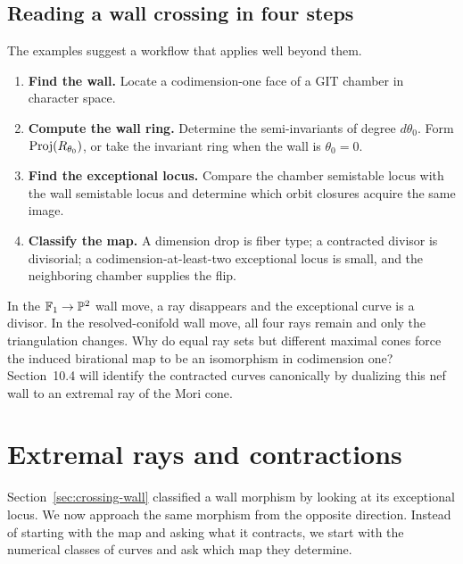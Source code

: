 \subsection{Reading a wall crossing in four steps}

The examples suggest a workflow that applies well beyond them.
\begin{enumerate}
\item \textbf{Find the wall.}
      Locate a codimension-one face of a GIT chamber in character
      space.
\item \textbf{Compute the wall ring.}
      Determine the semi-invariants of degree \(d\theta_0\).  Form
      \(\operatorname{Proj}(R_{\theta_0})\), or take the invariant ring when the
      wall is \(\theta_0=0\).
\item \textbf{Find the exceptional locus.}
      Compare the chamber semistable locus with the wall semistable
      locus and determine which orbit closures acquire the same image.
\item \textbf{Classify the map.}
      A dimension drop is fiber type; a contracted divisor is
      divisorial; a codimension-at-least-two exceptional locus is
      small, and the neighboring chamber supplies the flip.
\end{enumerate}

\begin{pauseandthink}
In the \(\mathbb F_1\to\mathbb{P}^2\) wall move, a ray disappears and the
exceptional curve is a divisor.  In the resolved-conifold wall move,
all four rays remain and only the triangulation changes.  Why do equal
ray sets but different maximal cones force the induced birational map
to be an isomorphism in codimension one?  Section~10.4 will identify
the contracted curves canonically by dualizing this nef wall to an
extremal ray of the Mori cone.
\end{pauseandthink}

\section{Extremal rays and contractions}
\label{sec:extremal-rays-contractions}

Section~\ref{sec:crossing-wall} classified a wall morphism by looking
at its exceptional locus.  We now approach the same morphism from the
opposite direction.  Instead of starting with the map and asking what
it contracts, we start with the numerical classes of curves and ask
which map they determine.

